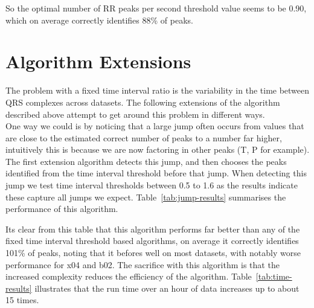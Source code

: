 So the optimal number of RR peaks per second threshold value seems to be 0.90, which on average correctly identifies 88\% of peaks.


\section{Algorithm Extensions}
The problem with a fixed time interval ratio is the variability in the time between QRS complexes across
datasets. The following extensions of the algorithm described above attempt to get around this problem 
in different ways. \\

One way we could is by noticing that a large jump often occurs from values that are close to the estimated correct
number of peaks to a number far higher, intuitively this is because we are now factoring in other peaks (T, P for example).
The first extension algorithm detects this jump, and then chooses the peaks identified from the 
time interval threshold before that jump. When detecting this jump we test time interval thresholds between 
0.5 to 1.6 as the results indicate these capture all jumps we expect. Table~\ref{tab:jump-results} summarises the performance of this 
algorithm. 
\begin{table}[H]
    \centering
    \caption{Proportion of peaks detected for the jump based algorithm}
    \label{tab:jump-results}
\end{table}
Its clear from this table that this algorithm performs far better than any of 
the fixed time interval threshold based algorithms, on average it correctly identifies 101\% of 
peaks, noting that it befores well on most datasets, with notably worse performance for x04 and b02.
The sacrifice with this algorithm is that the increased complexity reduces the efficiency 
of the algorithm. Table~\ref{tab:time-results} illustrates that the run time over an hour of data increases 
up to about 15 times. 
\begin{table}[H]
    \centering
    \caption{Time Comparison (sec) for running each algorithm over an hour of data}
    \label{tab:time-results}
\end{table}

\newpage

